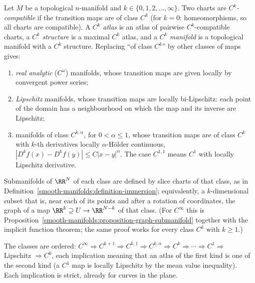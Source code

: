 \begin{definition}\label{smooth-manifolds:definition-regularity}
Let $M$ be a topological $n$-manifold and $k \in \{0, 1, 2, \ldots, \infty\}$. Two charts are \emph{$C^k$-compatible} if the transition maps are of class $C^k$ (for $k = 0$: homeomorphisms, so all charts are
compatible). A \emph{$C^k$ atlas} is an atlas of pairwise $C^k$-compatible charts, a \emph{$C^k$ structure} is a maximal $C^k$ atlas, and a \emph{$C^k$ manifold} is a topological manifold with a $C^k$ structure.
Replacing ``of class $C^k$'' by other classes of maps gives:
\begin{enumerate}
\item \emph{real analytic} ($C^\omega$) manifolds, whose transition maps are given locally by convergent power series;
\item \emph{Lipschitz} manifolds, whose transition maps are locally bi-Lipschitz: each point of the domain has a neighbourhood on which the map and its inverse are Lipschitz;
\item manifolds of class $C^{k,\alpha}$, for $0 < \alpha \leq 1$, whose transition maps are of class $C^k$ with $k$-th derivatives locally $\alpha$-H\"older continuous, $|D^kf(x) - D^kf(y)| \leq C|x - y|^\alpha$. The case
$C^{1,1}$ means $C^1$ with locally Lipschitz derivative.
\end{enumerate}
Submanifolds of $\RR^N$ of each class are defined by slice charts of that class, as in Definition~\ref{smooth-manifolds:definition-immersion}; equivalently, a $k$-dimensional subset that is, near each of its points and
after a rotation of coordinates, the graph of a map $\RR^k \supseteq U \to \RR^{N-k}$ of that class. (For $C^\infty$ this is Proposition~\ref{smooth-manifolds:proposition-graph-submanifold} together with the implicit function
theorem; the same proof works for every class $C^k$ with $k \geq 1$.)
\end{definition}

The classes are ordered: $C^\infty \Rightarrow C^{k+1} \Rightarrow C^{k,1} \Rightarrow C^{k,\alpha} \Rightarrow C^k \Rightarrow \cdots \Rightarrow C^1 \Rightarrow$ Lipschitz $\Rightarrow C^0$, each implication meaning that an atlas of the first
kind is one of the second kind (a $C^1$ map is locally Lipschitz by the mean value inequality). Each implication is strict, already for curves in the plane.

